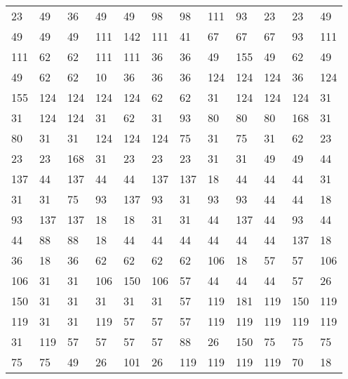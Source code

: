 \begin{longtable}{llllllllllll}
23 &49& 36 &49 &49& 98&98 &111& 93 &23 &23& 49\\
49 &49& 49 &111 &142& 111&41 &67& 67 &67 &93& 111\\
111 &62& 62 &111 &111& 36&36 &49& 155 &49 &62& 49\\
49 &62& 62 &10 &36& 36&36 &124& 124 &124 &36& 124\\
155 &124& 124 &124 &124& 62&62 &31& 124 &124 &124& 31\\
31 &124& 124 &31 &62& 31&93 &80& 80 &80 &168& 31\\
80 &31& 31 &124 &124& 124&75 &31& 75 &31 &62& 23\\
23 &23& 168 &31 &23& 23&23 &31& 31 &49 &49& 44\\
137 &44& 137 &44 &44& 137&137 &18& 44 &44 &44& 31\\
31 &31& 75 &93 &137& 93&31 &93& 93 &44 &44& 18\\
93 &137& 137 &18 &18& 31&31 &44& 137 &44 &93& 44\\
44 &88& 88 &18 &44& 44&44 &44& 44 &44 &137& 18\\
36 &18& 36 &62 &62& 62&62 &106& 18 &57 &57& 106\\
106 &31& 31 &106 &150& 106&57 &44& 44 &44 &57& 26\\
150 &31& 31 &31 &31& 31&57 &119& 181 &119 &150& 119\\
119 &31& 31 &119 &57& 57&57 &119& 119 &119 &119& 119\\
31 &119& 57 &57 &57& 57&88 &26& 150 &75 &75& 75\\
75 &75& 49 &26 &101& 26&119 &119& 119 &119 &70& 18\\
\bottomrule\end{longtable}
